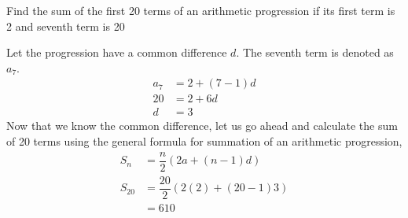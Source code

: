 

\question[4] Find the sum of the first 20 terms of an arithmetic progression 
if its first term is 2 and seventh term is 20


\ifprintanswers
\fi 

\begin{solution}[\halfpage]
  Let the progression have a common difference $d$. The seventh term is denoted as $a_7$.
  \begin{align}
    a_7 &= 2 + (7-1)d \\
    20  &= 2 + 6d \\
    d   &= 3 
  \end{align}
  Now that we know the common difference, let us go ahead and calculate the sum of 20 terms using the general formula for summation of an arithmetic progression,
  \begin{align}
    S_n    &= \dfrac{n}{2}(2a + (n-1)d) \\
    S_{20} &= \dfrac{20}{2}(2(2) + (20-1)3) \\
           &= 610
  \end{align}

\end{solution}

